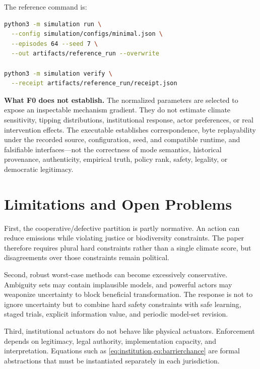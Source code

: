 \documentclass[11pt,a4paper]{article}
\numberwithin{equation}{section}
\theoremstyle{definition}
\theoremstyle{plain}
\theoremstyle{remark}
\begin{document}
The reference command is:

\begin{lstlisting}[style=paperpseudo,language=bash]
python3 -m simulation run \
  --config simulation/configs/minimal.json \
  --episodes 64 --seed 7 \
  --out artifacts/reference_run --overwrite

python3 -m simulation verify \
  --receipt artifacts/reference_run/receipt.json
\end{lstlisting}

\begin{boundarybox}
\textbf{What F0 does not establish.} The normalized parameters are selected to expose an inspectable mechanism gradient. They do not estimate climate sensitivity, tipping distributions, institutional response, actor preferences, or real intervention effects. The executable establishes correspondence, byte replayability under the recorded source, configuration, seed, and compatible runtime, and falsifiable interfaces---not the correctness of mode semantics, historical provenance, authenticity, empirical truth, policy rank, safety, legality, or democratic legitimacy.
\end{boundarybox}

\section{Limitations and Open Problems}

First, the cooperative/defective partition is partly normative. An action can reduce emissions while violating justice or biodiversity constraints. The paper therefore requires plural hard constraints rather than a single climate score, but disagreements over those constraints remain political.

Second, robust worst-case methods can become excessively conservative. Ambiguity sets may contain implausible models, and powerful actors may weaponize uncertainty to block beneficial transformation. The response is not to ignore uncertainty but to combine hard safety constraints with safe learning, staged trials, explicit information value, and periodic model-set revision.

Third, institutional actuators do not behave like physical actuators. Enforcement depends on legitimacy, legal authority, implementation capacity, and interpretation. Equations such as \cref{eq:institution,eq:barrierchance} are formal abstractions that must be instantiated separately in each jurisdiction.
\end{document}
